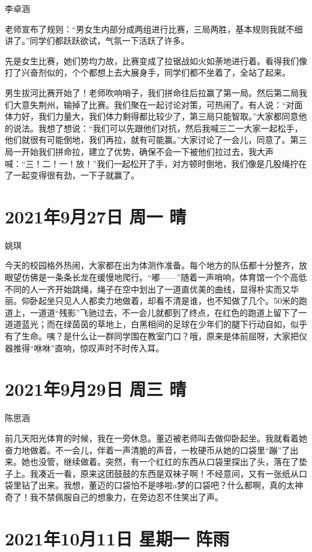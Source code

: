 李卓涵

老师宣布了规则：“男女生内部分成两组进行比赛，三局两胜，基本规则我就不细讲了。”同学们都跃跃欲试，气氛一下活跃了许多。

先是女生比赛，她们势均力故，比赛变成了拉锯战如火如荼地进行着。看得我们像打了兴奋剂似的，个个都想上去大展身手，同学们都不坐着了，全站了起来。

男生拔河比赛开始了！老师吹响哨子，我们拼命往后拉赢了第一局。然后第二局我们大意失荆州，输掉了比赛。我们聚在一起讨论对策，可热闹了。有人说：“对面体力好，我们力量大，我们体力剩得都比较少了，第三局只能智取。”大家都同意他的说法。我想了想说：“我们可以先跟他们对抗，然后我喊三二一大家一起松手，他们就很有可能倒地，我们再拉，就有可能赢。”大家讨论了一会儿，同意了。第三局一开始我们拼命拉，建立了优势，确保不会一下被他们拉过去，我大声喊：“三！二！一！放！”我们一起松开了手，对方顿时倒地，我们像是几股绳拧在了一起变得很有劲，一下子就赢了。

\section{2021年9月27日 周一 晴}

姚琪

今天的校园格外热闹，大家都在出为体测作准备。每个地方的队伍都十分整齐，放眼望仿佛是一条条长龙在缓慢地爬行。“嘟——”随着一声哨响，体育馆一个个高低不同的人一齐开始跳绳，绳子在空中划出了一道直优美的曲线，显得朴实而又华丽。仰卧起坐只见人人都卖力地做着，却看不清是谁，也不知做了几个。50米的跑道上，一道道“残影”飞驰过去，不一会儿就都到了终点，在红色的跑道上留下了一道道蓝光；而在绿茵茵的草地上，白黑相间的足球在少年们的腿下行动自如，似乎有了生命。咦？是什么让一群同学围在教室门口？哦，原来是体前屈呀，大家把仪器推得“咻咻”直响，惊叹声时不时传入耳。

\section{2021年9月29日 周三 晴}

陈思涵

前几天阳光体育的时候，我在一旁休息。董迈被老师叫去做仰卧起坐。我就看着她奋力地做着。不一会儿，伴着一声清脆的声音，一枚硬币从她的口袋里“蹦”了出来。她也没管，继续做着。突然，有一个红红的东西从口袋里探出了头，落在了垫子上。我凑近一看，原来这团鼓鼓的东西是双袜子啊！不经意间，又有一张纸从口袋里钻了出来。我想，董迈的口袋怕不是哆啦a梦的口袋吧？什么都啊，真的太神奇了！我不禁佩服自己的想象力，在旁边忍不住笑出了声。

\section{2021年10月11日 星期一 阵雨}

